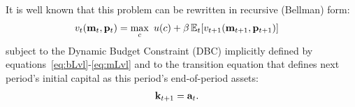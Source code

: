 It is well known that this problem can be rewritten in recursive (Bellman) form:
  \begin{equation}\begin{gathered}\begin{aligned}
        v_{t}(\mathbf{m}_{t},\mathbf{p}_{t})  & = \max_{c}~ u(c) + \beta \operatorname{\mathbb{E}}_{t}[ v_{t+1}({\mathbf{m}}_{t+1},\mathbf{p}_{t+1})]\label{eq:vrecurse}
      \end{aligned}\end{gathered}\end{equation}
subject to the Dynamic Budget Constraint (DBC) implicitly defined by equations~\eqref{eq:bLvl}-\eqref{eq:mLvl} and to the transition equation that defines next period's initial capital as this period's end-of-period assets:
\begin{equation}\begin{gathered}\begin{aligned}
      \mathbf{k}_{t+1} & = \mathbf{a}_{t}. \label{eq:transitionstate}
    \end{aligned}\end{gathered}\end{equation}


